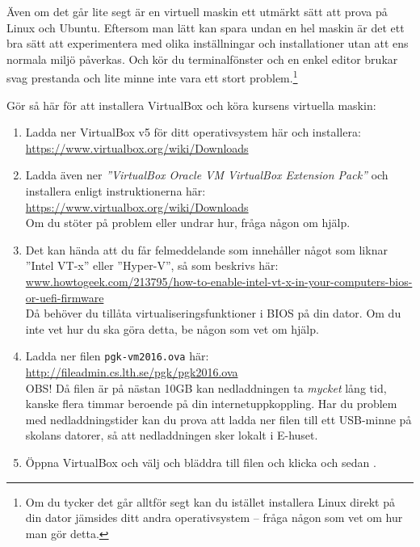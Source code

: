 Även om det går lite segt är en virtuell maskin ett utmärkt sätt att prova på Linux och Ubuntu. Eftersom man lätt kan spara undan en hel maskin är det ett bra sätt att experimentera med olika inställningar och installationer utan att ens normala miljö påverkas. Och kör du terminalfönster och en enkel editor brukar svag prestanda och lite minne inte vara ett stort problem.\footnote{Om du tycker det går alltför segt kan du istället installera Linux direkt på din dator jämsides ditt andra operativsystem -- fråga någon som vet om hur man gör detta.} 

Gör så här för att installera VirtualBox och köra kursens virtuella maskin:
\begin{enumerate}
\item  Ladda ner VirtualBox v5 för ditt operativsystem här och installera: \\ \url{https://www.virtualbox.org/wiki/Downloads}

\item Ladda även ner \textit{''VirtualBox Oracle VM VirtualBox Extension Pack''}  och installera enligt instruktionerna här:\\ \url{https://www.virtualbox.org/wiki/Downloads} \\ Om du stöter på problem eller undrar hur, fråga någon om hjälp.

\item Det kan hända att du får felmeddelande som innehåller något som liknar ''Intel VT-x'' eller ''Hyper-V'', så som beskrivs här:
\\ \href{http://www.howtogeek.com/213795/how-to-enable-intel-vt-x-in-your-computers-bios-or-uefi-firmware/}{www.howtogeek.com/213795/how-to-enable-intel-vt-x-in-your-computers-bios-or-uefi-firmware}\\
Då behöver du tillåta virtualiseringsfunktioner i BIOS på din dator. Om du inte vet hur du ska göra detta, be någon som vet om hjälp.

\item     Ladda ner filen \texttt{pgk-vm2016.ova} här: \\ \url{http://fileadmin.cs.lth.se/pgk/pgk2016.ova} \\ OBS! Då filen är på nästan 10GB kan nedladdningen ta \textit{mycket} lång tid, kanske flera timmar beroende på din internetuppkoppling. Har du problem med nedladdningstider kan du prova att ladda ner filen till ett USB-minne på skolans datorer, så att nedladdningen sker lokalt i E-huset.

\item     Öppna VirtualBox och välj  och bläddra till filen  och klicka  och sedan .


\end{enumerate}
